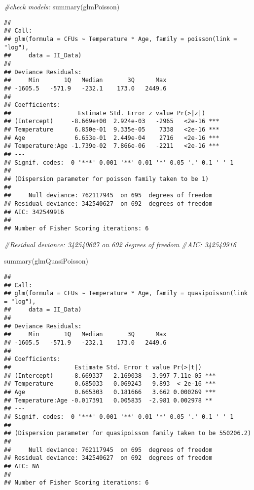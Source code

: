 \documentclass[
]{article}
\newenvironment{Shaded}{\begin{snugshade}}{\end{snugshade}}
\newcommand{\CommentTok}[1]{\textcolor[rgb]{0.56,0.35,0.01}{\textit{#1}}}
\newcommand{\FunctionTok}[1]{\textcolor[rgb]{0.00,0.00,0.00}{#1}}
\newcommand{\NormalTok}[1]{#1}
\begin{document}
\begin{Shaded}
\begin{Highlighting}[]
\CommentTok{\#check models:}
\FunctionTok{summary}\NormalTok{(glmPoisson) }
\end{Highlighting}
\end{Shaded}

\begin{verbatim}
## 
## Call:
## glm(formula = CFUs ~ Temperature * Age, family = poisson(link = "log"), 
##     data = II_Data)
## 
## Deviance Residuals: 
##     Min       1Q   Median       3Q      Max  
## -1605.5   -571.9   -232.1    173.0   2449.6  
## 
## Coefficients:
##                   Estimate Std. Error z value Pr(>|z|)    
## (Intercept)     -8.669e+00  2.924e-03   -2965   <2e-16 ***
## Temperature      6.850e-01  9.335e-05    7338   <2e-16 ***
## Age              6.653e-01  2.449e-04    2716   <2e-16 ***
## Temperature:Age -1.739e-02  7.866e-06   -2211   <2e-16 ***
## ---
## Signif. codes:  0 '***' 0.001 '**' 0.01 '*' 0.05 '.' 0.1 ' ' 1
## 
## (Dispersion parameter for poisson family taken to be 1)
## 
##     Null deviance: 762117945  on 695  degrees of freedom
## Residual deviance: 342540627  on 692  degrees of freedom
## AIC: 342549916
## 
## Number of Fisher Scoring iterations: 6
\end{verbatim}

\begin{Shaded}
\begin{Highlighting}[]
\CommentTok{\#Residual deviance: 342540627  on 692  degrees of freedom}
\CommentTok{\#AIC: 342549916}

\FunctionTok{summary}\NormalTok{(glmQuasiPoisson)}
\end{Highlighting}
\end{Shaded}

\begin{verbatim}
## 
## Call:
## glm(formula = CFUs ~ Temperature * Age, family = quasipoisson(link = "log"), 
##     data = II_Data)
## 
## Deviance Residuals: 
##     Min       1Q   Median       3Q      Max  
## -1605.5   -571.9   -232.1    173.0   2449.6  
## 
## Coefficients:
##                  Estimate Std. Error t value Pr(>|t|)    
## (Intercept)     -8.669337   2.169038  -3.997 7.11e-05 ***
## Temperature      0.685033   0.069243   9.893  < 2e-16 ***
## Age              0.665303   0.181666   3.662 0.000269 ***
## Temperature:Age -0.017391   0.005835  -2.981 0.002978 ** 
## ---
## Signif. codes:  0 '***' 0.001 '**' 0.01 '*' 0.05 '.' 0.1 ' ' 1
## 
## (Dispersion parameter for quasipoisson family taken to be 550206.2)
## 
##     Null deviance: 762117945  on 695  degrees of freedom
## Residual deviance: 342540627  on 692  degrees of freedom
## AIC: NA
## 
## Number of Fisher Scoring iterations: 6
\end{verbatim}
\end{document}
